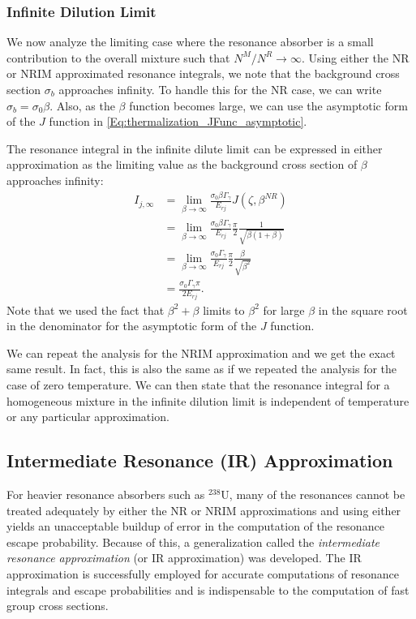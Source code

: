 \subsubsection{Infinite Dilution Limit}

We now analyze the limiting case where the resonance absorber is a small contribution to the overall mixture such that $N^M/N^R \rightarrow \infty$. Using either the NR or NRIM approximated resonance integrals, we note that the background cross section $\sigma_b$ approaches infinity. To handle this for the NR case, we can write $\sigma_b = \sigma_0 \beta$. Also, as the $\beta$ function becomes large, we can use the asymptotic form of the $J$ function in \eqref{Eq:thermalization_JFunc_asymptotic}. 

The resonance integral in the infinite dilute limit can be expressed in either approximation as the limiting value as the background cross section of $\beta$ approaches infinity:
\begin{align}
  I_{j,\infty} 
  &= \lim_{\beta \rightarrow \infty} \frac{ \sigma_0 \beta \Gamma_\gamma }{ E_{rj} } J( \zeta, \beta^{NR} ) \nonumber \\
  &= \lim_{\beta \rightarrow \infty} \frac{ \sigma_0 \beta \Gamma_\gamma }{ E_{rj} } \frac{\pi}{2}  \frac{1}{\sqrt{\beta ( 1 + \beta) }} \nonumber \\
  &= \lim_{\beta \rightarrow \infty} \frac{ \sigma_0 \Gamma_\gamma }{ E_{rj} } \frac{\pi}{2}  \frac{\beta }{\sqrt{\beta^2 }} \nonumber \\  
  &=  \frac{ \sigma_0 \Gamma_\gamma \pi }{ 2 E_{rj} } .    
\end{align}
Note that we used the fact that $\beta^2 + \beta$ limits to $\beta^2$ for large $\beta$ in the square root in the denominator for the asymptotic form of the $J$ function.

We can repeat the analysis for the NRIM approximation and we get the exact same result. In fact, this is also the same as if we repeated the analysis for the case of zero temperature. We can then state that the resonance integral for a homogeneous mixture in the infinite dilution limit is independent of temperature or any particular approximation.

\subsection{Intermediate Resonance (IR) Approximation}

For heavier resonance absorbers such as $^{238}$U, many of the resonances cannot be treated adequately by either the NR or NRIM approximations and using either yields an unacceptable buildup of error in the computation of the resonance escape probability. Because of this, a generalization called the \emph{intermediate resonance approximation} (or IR approximation) was developed. The IR approximation is successfully employed for accurate computations of resonance integrals and escape probabilities and is indispensable to the computation of fast group cross sections.

